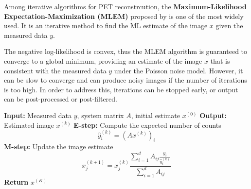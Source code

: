 Among iterative algorithms for PET reconstrcution, the \textbf{Maximum-Likelihood Expectation-Maximization (MLEM)} proposed by \cite{Shepp1982} is one of the most widely used. It is an iterative method to find the ML estimate of the image $x$ given the measured data $y$.

The negative log-likelihood is convex, thus the MLEM algorithm is guaranteed to converge to a global minimum, providing an estimate of the image $x$ that is consistent with the measured data $y$ under the Poisson noise model.
However, it can be slow to converge and can produce noisy images if the number of iterations is too high.
In order to address this, iterations can be stopped early, or output can be post-processed or post-filtered.

\begin{algorithm}
\caption{Maximum-Likelihood Expectation-Maximization (MLEM)}
\begin{algorithmic}[1]
\State \textbf{Input:} Measured data $y$, system matrix $A$, initial estimate $x^{(0)}$
\State \textbf{Output:} Estimated image $x^{(k)}$
    \State \textbf{E-step:} Compute the expected number of counts
    \begin{equation*}
        \hat{y}_i^{(k)} = (Ax^{(k)})_i
    \end{equation*}
    \State \textbf{M-step:} Update the image estimate
    \begin{equation*}
        x_j^{(k+1)} = x_j^{(k)} \frac{\sum_{i=1}^{d} A_{ij} \frac{y_i}{\hat{y}_i^{(k)}}}{\sum_{i=1}^{d} A_{ij}}
    \end{equation*}
\EndFor
\State \textbf{Return} $x^{(K)}$
\end{algorithmic}
\label{alg:mlem}
\end{algorithm}


